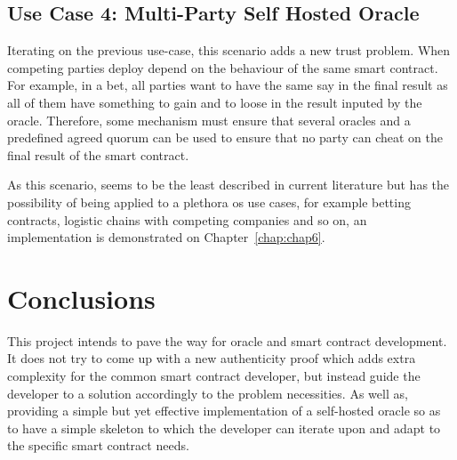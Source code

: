\subsection{Use Case 4: Multi-Party Self Hosted Oracle}

Iterating on the previous use-case, this scenario adds a new trust problem. When competing parties deploy depend on the behaviour of the same smart contract. For example, in a bet, all parties want to have the same say in the final result as all of them have something to gain and to loose in the result inputed by the oracle. Therefore, some mechanism must ensure that several oracles and a predefined agreed quorum can be used to ensure that no party can cheat on the final result of the smart contract.

As this scenario, seems to be the least described in current literature but has the possibility of being applied to a plethora os use cases, for example betting contracts, logistic chains with competing companies and so on, an implementation is demonstrated on Chapter~\ref{chap:chap6}.



\section{Conclusions}
This project intends to pave the way for oracle and smart contract development. It does not try to come up with a new authenticity proof which adds extra complexity for the common smart contract developer, but instead guide the developer to a solution accordingly to the problem necessities. As well as, providing a simple but yet effective implementation of a self-hosted oracle so as to have a simple skeleton to which the developer can iterate upon and adapt to the specific smart contract needs.